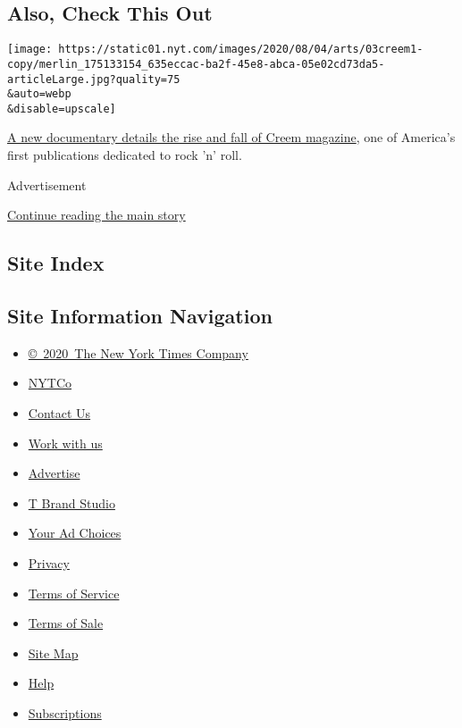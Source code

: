 \hypertarget{also-check-this-out}{%
\subsection{Also, Check This Out}\label{also-check-this-out}}

\texttt{[image: https://static01.nyt.com/images/2020/08/04/arts/03creem1-copy/merlin\_175133154\_635eccac-ba2f-45e8-abca-05e02cd73da5-articleLarge.jpg?quality=75\\\&auto=webp\\\&disable=upscale]}

\href{https://www.nytimes.com/2020/08/03/arts/music/creem-magazine-documentary.html}{A
new documentary details the rise and fall of Creem magazine}, one of
America's first publications dedicated to rock 'n' roll.

Advertisement

\protect\hyperlink{after-bottom}{Continue reading the main story}

\hypertarget{site-index}{%
\subsection{Site Index}\label{site-index}}

\hypertarget{site-information-navigation}{%
\subsection{Site Information
Navigation}\label{site-information-navigation}}

\begin{itemize}
\tightlist
\item
  \href{https://help.nytimes.com/hc/en-us/articles/115014792127-Copyright-notice}{©~2020~The
  New York Times Company}
\end{itemize}

\begin{itemize}
\tightlist
\item
  \href{https://www.nytco.com/}{NYTCo}
\item
  \href{https://help.nytimes.com/hc/en-us/articles/115015385887-Contact-Us}{Contact
  Us}
\item
  \href{https://www.nytco.com/careers/}{Work with us}
\item
  \href{https://nytmediakit.com/}{Advertise}
\item
  \href{http://www.tbrandstudio.com/}{T Brand Studio}
\item
  \href{https://www.nytimes.com/privacy/cookie-policy\#how-do-i-manage-trackers}{Your
  Ad Choices}
\item
  \href{https://www.nytimes.com/privacy}{Privacy}
\item
  \href{https://help.nytimes.com/hc/en-us/articles/115014893428-Terms-of-service}{Terms
  of Service}
\item
  \href{https://help.nytimes.com/hc/en-us/articles/115014893968-Terms-of-sale}{Terms
  of Sale}
\item
  \href{https://spiderbites.nytimes.com}{Site Map}
\item
  \href{https://help.nytimes.com/hc/en-us}{Help}
\item
  \href{https://www.nytimes.com/subscription?campaignId=37WXW}{Subscriptions}
\end{itemize}
